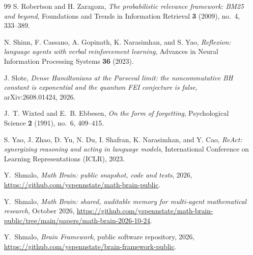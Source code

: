 \begin{thebibliography}{99}
S. Robertson and H. Zaragoza, \emph{The probabilistic relevance framework: BM25 and beyond}, Foundations and Trends in Information Retrieval \textbf{3} (2009), no.~4, 333--389.

N. Shinn, F. Cassano, A. Gopinath, K. Narasimhan, and S. Yao, \emph{Reflexion: language agents with verbal reinforcement learning}, Advances in Neural Information Processing Systems \textbf{36} (2023).

J. Slote, \emph{Dense Hamiltonians at the Parseval limit: the noncommutative BH constant is exponential and the quantum FEI conjecture is false}, arXiv:2608.01424, 2026.

J.~T. Wixted and E.~B. Ebbesen, \emph{On the form of forgetting}, Psychological Science \textbf{2} (1991), no.~6, 409--415.

S. Yao, J. Zhao, D. Yu, N. Du, I. Shafran, K. Narasimhan, and Y. Cao, \emph{ReAct: synergizing reasoning and acting in language models}, International Conference on Learning Representations (ICLR), 2023.

 Y.~Shmalo, \emph{Math Brain: public snapshot, code and tests}, 2026, \url{https://github.com/yspennstate/math-brain-public}.

 Y.~Shmalo, \emph{Math Brain: shared, auditable memory for multi-agent mathematical research}, October 2026, \url{https://github.com/yspennstate/math-brain-public/tree/main/papers/math-brain-2026-10-24}.

 Y.~Shmalo, \emph{Brain Framework}, public software repository, 2026, \url{https://github.com/yspennstate/brain-framework-public}.

\end{thebibliography}
